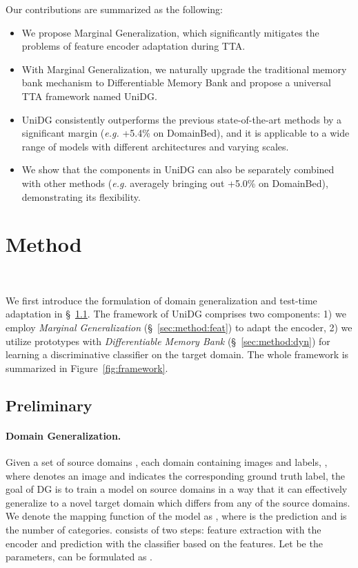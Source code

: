 \documentclass{article} \usepackage{iclr2024_conference,times}
\begin{document}
    Our contributions are summarized as the following:
    \begin{itemize}
        \item We propose Marginal Generalization, which significantly mitigates the problems of feature encoder adaptation during TTA.
        \item With Marginal Generalization, we naturally upgrade the traditional memory bank mechanism to Differentiable Memory Bank and propose a universal TTA framework named UniDG.
        \item UniDG consistently outperforms the previous state-of-the-art methods by a significant margin (\textit{e.g.} +5.4\% on DomainBed), and it is applicable to a wide range of models with different architectures and varying scales.
        \item We show that the components in UniDG can also be separately combined with other methods (\textit{e.g.} averagely bringing out +5.0\% on DomainBed), demonstrating its flexibility.
    \end{itemize}

    \section{Method} ~\label{sec:method}
    
    We first introduce the formulation of domain generalization and test-time adaptation in \S~\ref{sec:method:pre}. The framework of UniDG comprises two components: 1) we employ \emph{Marginal  Generalization} (\S~\ref{sec:method:feat}) to adapt the encoder, 2) we utilize prototypes with \emph{Differentiable Memory Bank } (\S~\ref{sec:method:dyn}) for learning a discriminative classifier on the target domain. The whole framework is summarized in Figure~\ref{fig:framework}. 
    
    \subsection{Preliminary} \label{sec:method:pre}
    
    \paragraph{Domain Generalization.}
    Given a set of source domains , each domain  containing images and labels, , where  denotes an image and  indicates the corresponding ground truth label, the goal of DG is to train a model on source domains  in a way that it can effectively generalize to a novel target domain  which differs from any of the source domains. We denote the mapping function of the model as , where  is the prediction and  is the number of categories.  consists of two steps: feature extraction with the encoder  and prediction with the classifier  based on the features. Let  be the parameters,  can be formulated as . 
\end{document}
